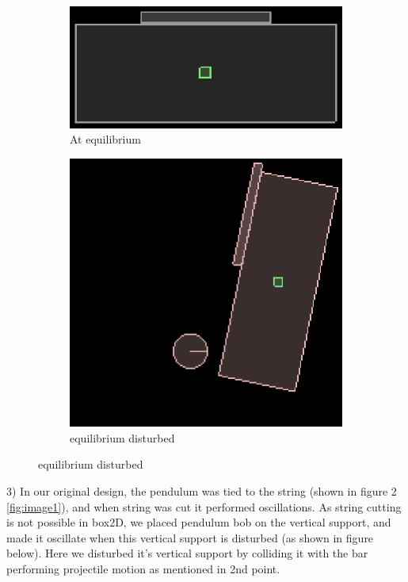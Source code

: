 \documentclass[a4paper,11pt]{article}
\begin{document}
{\begin{figure}[ht!]
\centering
\begin{subfigure}{.5\textwidth}
  \centering
  \includegraphics[width=.4\linewidth]{image5}
  \caption{At equilibrium}
  \label{fig:image5}
\end{subfigure}%
\begin{subfigure}{.5\textwidth}
  \centering
  \includegraphics[width=.4\linewidth]{image6}
  \caption{equilibrium disturbed}
  \label{fig:image6}
\end{subfigure}
\end{figure}

3) In our original design, the pendulum was tied to the string (shown in figure 2 \ref{fig:image1}), and when string was cut it performed oscillations. As string cutting is not possible in box2D, we placed pendulum bob on the vertical support, and made it oscillate when this vertical support is disturbed (as shown in figure below). Here we disturbed it's vertical support by colliding it with the bar performing projectile motion as mentioned in 2nd point.\\

}
\end{document}
